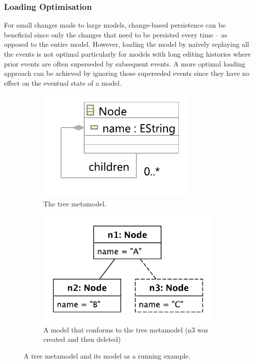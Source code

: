 \documentclass[12pt, a4paper]{report} \usepackage[titletoc]{appendix}
\begin{document}
\subsubsection{Loading Optimisation}
\label{loading_optimisation}
For small changes made to large models, change-based persistence can be beneficial since only the changes that need to be persisted every time -- as opposed to the entire model. However, loading the model by naively replaying all the events is not optimal particularly for models with long editing histories where prior events are often superseded by subsequent events. A more optimal loading approach can be achieved by ignoring those superseded events since they have no effect on the eventual state of a model. 

\begin{figure}[H]
    \begin{subfigure}[h]{0.4\linewidth}
        \centering
        \includegraphics[width=0.8\linewidth]{node_metamodel}
        \caption{The tree metamodel.}
        \label{fig:tree_metamodel}
    \end{subfigure}
    \hfill
    \begin{subfigure}[h]{0.6\linewidth}
        \centering
        \includegraphics[width=0.6\linewidth]{initial_chart}
        \caption{A model that conforms to the tree metamodel (n3 was created and then deleted)}
        \label{fig:initial_model}
    \end{subfigure}
    \caption{A tree metamodel and its model as a running example.}
    \label{fig:append_speed}
\end{figure}
\end{document}

